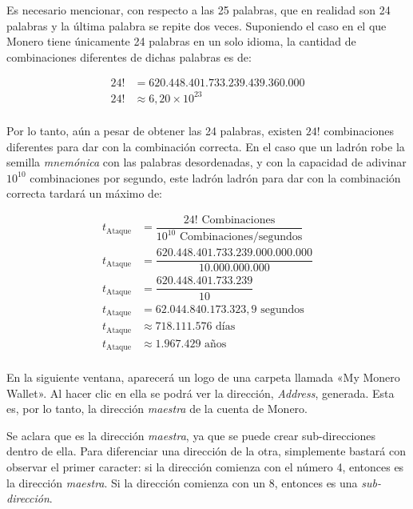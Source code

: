 \documentclass[12pt,a4paper,twoside]{book}
\begin{document}
Es necesario mencionar, con respecto a las 25 palabras, que en realidad son 24 palabras y la última palabra se repite dos veces. Suponiendo el caso en el que Monero tiene únicamente 24 palabras en un solo idioma, la cantidad de combinaciones diferentes de dichas palabras es de:

\begin{align*}
24! &= 620.448.401.733.239.439.360.000 \\
24! &\approx 6,20 \times 10^{23} \\
\end{align*}

Por lo tanto, aún a pesar de obtener las 24 palabras, existen $ 24! $ combinaciones diferentes para dar con la combinación correcta. En el caso que un ladrón robe la semilla \textit{mnemónica} con las palabras desordenadas, y con la capacidad de adivinar $ 10^{10} $ combinaciones por segundo, este ladrón ladrón para dar con la combinación correcta tardará un máximo de:

\begin{align*}
t_{\text{Ataque}} &= \dfrac{24! \text{ Combinaciones}}{10^{10} \text{ Combinaciones/segundos}} \\
t_{\text{Ataque}} &= \dfrac{620.448.401.733.239.000.000.000}{10.000.000.000} \\
t_{\text{Ataque}} &= \dfrac{620.448.401.733.239}{10} \\
t_{\text{Ataque}} &= 62.044.840.173.323,9 \text{ segundos} \\
t_{\text{Ataque}} &\approx 718.111.576 \text{ días} \\
t_{\text{Ataque}} &\approx 1.967.429 \text{ años} \\
\end{align*}

En la siguiente ventana, aparecerá un logo de una carpeta llamada «My Monero Wallet». Al hacer clic en ella se podrá ver la dirección, \textit{Address}, generada. Esta es, por lo tanto, la dirección \textit{maestra} de la cuenta de Monero.

Se aclara que es la dirección \textit{maestra}, ya que se puede crear sub-direcciones dentro de ella. Para diferenciar una dirección de la otra, simplemente bastará con observar el primer caracter: si la dirección comienza con el número 4, entonces es la dirección \textit{maestra}. Si la dirección comienza con un 8, entonces es una \textit{sub-dirección}.
\end{document}
